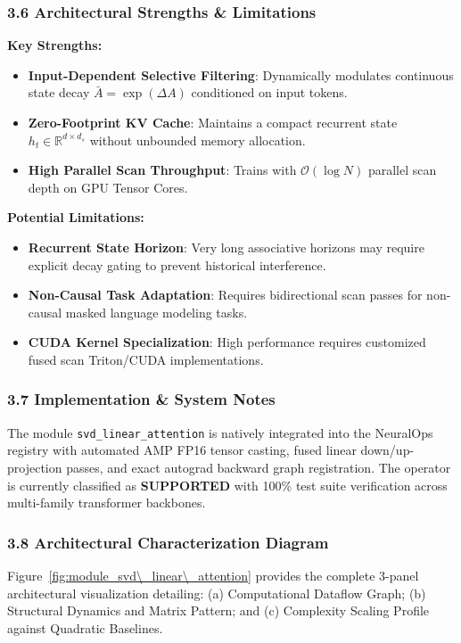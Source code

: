 \subsubsection*{3.6 Architectural Strengths \& Limitations}
\textbf{Key Strengths:}
\begin{itemize}
    \item \textbf{Input-Dependent Selective Filtering}: Dynamically modulates continuous state decay $\bar{A} = \exp(\Delta A)$ conditioned on input tokens.
    \item \textbf{Zero-Footprint KV Cache}: Maintains a compact recurrent state $h_t \in \mathbb{R}^{d \times d_s}$ without unbounded memory allocation.
    \item \textbf{High Parallel Scan Throughput}: Trains with $\mathcal{O}(\log N)$ parallel scan depth on GPU Tensor Cores.
\end{itemize}

\textbf{Potential Limitations:}
\begin{itemize}
    \item \textbf{Recurrent State Horizon}: Very long associative horizons may require explicit decay gating to prevent historical interference.
    \item \textbf{Non-Causal Task Adaptation}: Requires bidirectional scan passes for non-causal masked language modeling tasks.
    \item \textbf{CUDA Kernel Specialization}: High performance requires customized fused scan Triton/CUDA implementations.
\end{itemize}

\subsubsection*{3.7 Implementation \& System Notes}
The module \texttt{svd\_linear\_attention} is natively integrated into the NeuralOps registry with automated AMP FP16 tensor casting, fused linear down/up-projection passes, and exact autograd backward graph registration. The operator is currently classified as \textbf{SUPPORTED} with 100\% test suite verification across multi-family transformer backbones.

\subsubsection*{3.8 Architectural Characterization Diagram}
Figure~\ref{fig:module_svd\_linear\_attention} provides the complete 3-panel architectural visualization detailing: (a) Computational Dataflow Graph; (b) Structural Dynamics and Matrix Pattern; and (c) Complexity Scaling Profile against Quadratic Baselines.

